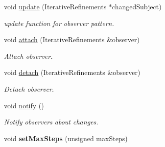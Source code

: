 \begin{DoxyCompactItemize}
\item 
\hypertarget{classSpacy_1_1Mixin_1_1IterativeRefinements_adcb6062728331e48515a05f539628062}{}void \hyperlink{classSpacy_1_1Mixin_1_1IterativeRefinements_adcb6062728331e48515a05f539628062}{update} (Iterative\+Refinements $\ast$changed\+Subject)\label{classSpacy_1_1Mixin_1_1IterativeRefinements_adcb6062728331e48515a05f539628062}

\begin{DoxyCompactList}\small\item\em update function for observer pattern. \end{DoxyCompactList}\item 
\hypertarget{classSpacy_1_1Mixin_1_1MixinConnection_abb5520ee6b22dd993d78f142939a1ed4}{}void \hyperlink{classSpacy_1_1Mixin_1_1MixinConnection_abb5520ee6b22dd993d78f142939a1ed4}{attach} (Iterative\+Refinements \&observer)\label{classSpacy_1_1Mixin_1_1MixinConnection_abb5520ee6b22dd993d78f142939a1ed4}

\begin{DoxyCompactList}\small\item\em Attach observer. \end{DoxyCompactList}\item 
\hypertarget{classSpacy_1_1Mixin_1_1MixinConnection_adda739590c487679c26f60e50aedb73f}{}void \hyperlink{classSpacy_1_1Mixin_1_1MixinConnection_adda739590c487679c26f60e50aedb73f}{detach} (Iterative\+Refinements \&observer)\label{classSpacy_1_1Mixin_1_1MixinConnection_adda739590c487679c26f60e50aedb73f}

\begin{DoxyCompactList}\small\item\em Detach observer. \end{DoxyCompactList}\item 
\hypertarget{classSpacy_1_1Mixin_1_1MixinConnection_a1ddeaa78a3bb4a38c2cca36d1f99fe36}{}void \hyperlink{classSpacy_1_1Mixin_1_1MixinConnection_a1ddeaa78a3bb4a38c2cca36d1f99fe36}{notify} ()\label{classSpacy_1_1Mixin_1_1MixinConnection_a1ddeaa78a3bb4a38c2cca36d1f99fe36}

\begin{DoxyCompactList}\small\item\em Notify observers about changes. \end{DoxyCompactList}\item 
\hypertarget{classSpacy_1_1Mixin_1_1MaxSteps_a72f0b7eb50c9a017b5f5e6c2ccf7dfd9}{}void {\bfseries set\+Max\+Steps} (unsigned max\+Steps)\label{classSpacy_1_1Mixin_1_1MaxSteps_a72f0b7eb50c9a017b5f5e6c2ccf7dfd9}


\end{DoxyCompactItemize}
